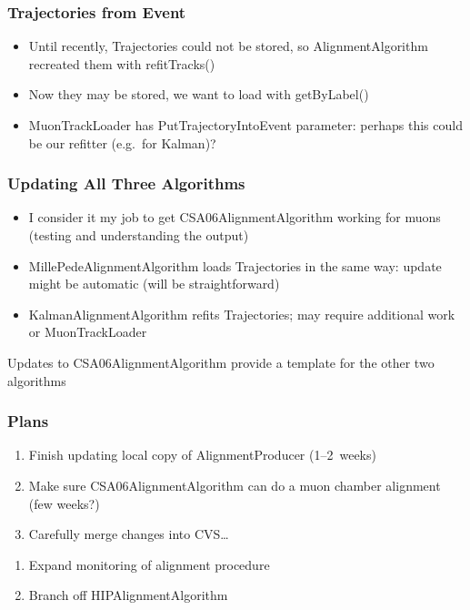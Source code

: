 \documentclass[12pt,compress]{beamer}
\begin{document}
\begin{frame}
\frametitle{Trajectories from Event}
\begin{itemize}\setlength{\itemsep}{0.75 cm}
\item Until recently, Trajectories could not be stored, so
  AlignmentAlgorithm recreated them with refitTracks()
\item Now they may be stored, we want to load with getByLabel()
\item MuonTrackLoader has PutTrajectoryIntoEvent parameter: perhaps
  this could be our refitter (e.g.\ for Kalman)?
\end{itemize}
\end{frame}

\begin{frame}
\frametitle{Updating All Three Algorithms}
\begin{itemize}\setlength{\itemsep}{0.5 cm}
\item I consider it my job to get CSA06AlignmentAlgorithm working for
  muons (testing and understanding the output)
\item MillePedeAlignmentAlgorithm loads Trajectories in the same way:
  update might be automatic (will be straightforward)
\item KalmanAlignmentAlgorithm refits Trajectories; may require
additional work or MuonTrackLoader
\end{itemize}

\vfill Updates to CSA06AlignmentAlgorithm provide a template for the
other two algorithms
\end{frame}

\begin{frame}
\frametitle{Plans}
\begin{enumerate}\setlength{\itemsep}{0.25 cm}
  \item Finish updating local copy of AlignmentProducer (1--2~weeks)
  \item Make sure CSA06AlignmentAlgorithm can do a muon chamber
  alignment (few weeks?)
  \item Carefully merge changes into CVS\ldots
\end{enumerate}

\vfill
\begin{enumerate}\setlength{\itemsep}{0.25 cm}\setcounter{enumi}{3}
  \item Expand monitoring of alignment procedure
  \item Branch off HIPAlignmentAlgorithm
\end{enumerate}
\label{numpages}
\end{frame}
\end{document}
